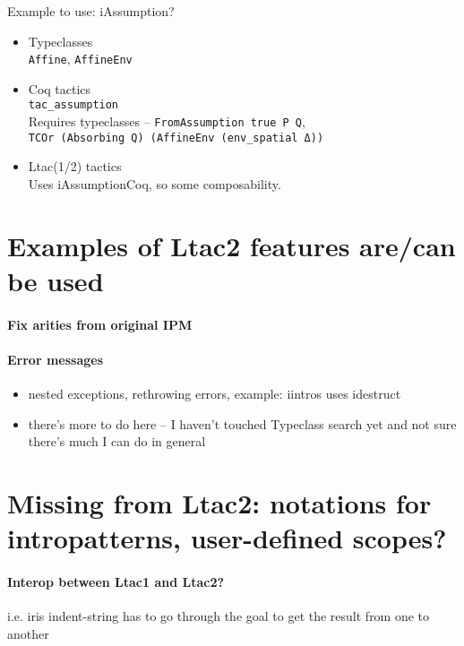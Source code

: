 Example to use: iAssumption?
\begin{itemize}
\item Typeclasses\\
  \verb|Affine|, \verb|AffineEnv|
\item Coq tactics\\
  \verb|tac_assumption|\\
  Requires typeclasses -- \verb|FromAssumption true P Q|,\\
  \verb|TCOr (Absorbing Q) (AffineEnv (env_spatial Δ))|
\item Ltac(1/2) tactics\\
  Uses iAssumptionCoq, so some composability.
\end{itemize}


\section{Examples of Ltac2 features are/can be used}

\paragraph{Fix arities from original IPM}

\paragraph{Error messages}

\begin{itemize}
\item nested exceptions, rethrowing errors, example: iintros uses idestruct
\item there's more to do here -- I haven't touched Typeclass search yet and not sure there's much I can do in general
\end{itemize}

\section{Missing from Ltac2: notations for intropatterns, user-defined scopes?}

\paragraph{Interop between Ltac1 and Ltac2?}
i.e. iris indent-string has to go through the goal to get the result from one to another